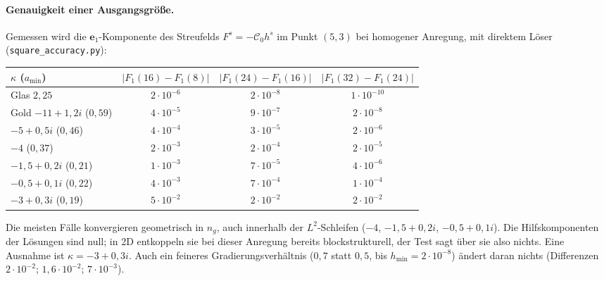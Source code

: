 \documentclass[11pt, a4paper]{article}
\newcommand{\mvec}[1]{\boldsymbol{#1}}
\theoremstyle{plain}
\theoremstyle{definition}
\begin{document}
\paragraph{Genauigkeit einer Ausgangsgröße.} Gemessen wird die
$\mvec{e}_1$-Komponente des Streufelds $F^s = -\mathcal{C}_0h^s$ im Punkt $(5,3)$
bei homogener Anregung, mit direktem Löser (\texttt{square\_accuracy.py}):
\begin{center}\small
\begin{tabular}{lccc}
\toprule
$\kappa$ ($a_{\min}$) & $|F_1(16)-F_1(8)|$ & $|F_1(24)-F_1(16)|$ & $|F_1(32)-F_1(24)|$\\
\midrule
Glas $2{,}25$ & $2\cdot10^{-6}$ & $2\cdot10^{-8}$ & $1\cdot10^{-10}$\\
Gold $-11+1{,}2i$ ($0{,}59$) & $4\cdot10^{-5}$ & $9\cdot10^{-7}$ & $2\cdot10^{-8}$\\
$-5+0{,}5i$ ($0{,}46$) & $4\cdot10^{-4}$ & $3\cdot10^{-5}$ & $2\cdot10^{-6}$\\
$-4$ ($0{,}37$) & $2\cdot10^{-3}$ & $2\cdot10^{-4}$ & $2\cdot10^{-5}$\\
$-1{,}5+0{,}2i$ ($0{,}21$) & $1\cdot10^{-3}$ & $7\cdot10^{-5}$ & $4\cdot10^{-6}$\\
$-0{,}5+0{,}1i$ ($0{,}22$) & $4\cdot10^{-3}$ & $7\cdot10^{-4}$ & $1\cdot10^{-4}$\\
$-3+0{,}3i$ ($0{,}19$) & $5\cdot10^{-2}$ & $2\cdot10^{-2}$ & $2\cdot10^{-2}$\\
\bottomrule
\end{tabular}
\end{center}
Die meisten Fälle konvergieren geometrisch in $n_g$, auch innerhalb der
$L^2$-Schleifen ($-4$, $-1{,}5+0{,}2i$, $-0{,}5+0{,}1i$). Die Hilfskomponenten der
Lösungen sind null; in 2D entkoppeln sie bei dieser Anregung bereits
blockstrukturell, der Test sagt über sie also nichts. Eine Ausnahme ist
$\kappa=-3+0{,}3i$. Auch ein feineres Gradierungsverhältnis ($0{,}7$ statt $0{,}5$,
bis $h_{\min}=2\cdot10^{-8}$) ändert daran nichts (Differenzen $2\cdot10^{-2}$;
$1{,}6\cdot10^{-2}$; $7\cdot10^{-3}$).
\end{document}
